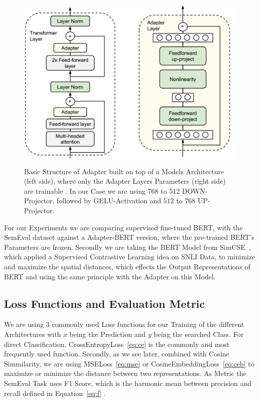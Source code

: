 \begin{figure}[!b]
    \centering
    \includegraphics[scale=0.25]{./content/Adapter_Architecture.png}
    \caption{Basic Structure of Adapter built on top of a Models Architecture (left side), where only the Adapter Layers Parameters (right side) are trainable \cite{zheng_learn_2023}.
             In our Case we are using $768$ to $512$ DOWN-Projector, followed by GELU-Activation and
             $512$ to $768$ UP-Projector.}
    \label{tab:adapt}
\end{figure}


For our Experiments we are comparing supervised fine-tuned BERT, with the SemEval dataset against
a Adapter-BERT version, where the pre-trained BERT's Parameters are frozen. Secondly we are
taking the BERT Model from SimCSE~\cite{gao_simcse_2022-1}, which applied a Supervised
Contrastive Learning idea on SNLI Data, to minimize and maximize the spatial distances,
which effects the Output Representations of BERT and using the same principle with the Adapter on this Model.







\subsection{Loss Functions and Evaluation Metric}
We are using 3 commonly used Loss functions for our Training of the different
Architectures with $x$ being the Prediction and $y$ being the searched Class. For direct Classification, 
CrossEntropyLoss~\ref{eq:ce} is the commonly and most frequently used function. Secondly, as we see later,
combined with Cosine Simmilarity, we are using MSELoss~\ref{eq:mse} or CosineEmbeddingLoss~\ref{eq:ceb}
to maximize or minimize the distance between two representations. As Metric the SemEval Task uses F1 Score, which
is the harmonic mean between precision and recall defined in Equation~\ref{eq:f} \cite{noauthor_nli4ct_nodate}.



